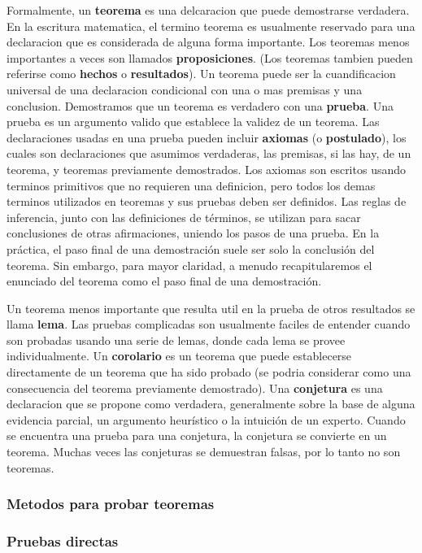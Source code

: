 \documentclass[]{article}
\begin{document}
Formalmente, un \textbf{teorema} es una delcaracion que puede demostrarse verdadera. En la escritura matematica, el termino teorema es usualmente reservado para una declaracion que es considerada de alguna forma importante. Los teoremas menos importantes a veces son llamados \textbf{proposiciones}. (Los teoremas tambien pueden referirse como \textbf{hechos} o \textbf{resultados}). Un teorema puede ser la cuandificacion universal de una declaracion condicional con una o mas premisas y una conclusion. Demostramos que un teorema es verdadero con una \textbf{prueba}. Una prueba es un argumento valido que establece la validez de un teorema. Las declaraciones usadas en una prueba pueden incluir \textbf{axiomas} (o \textbf{postulado}), los cuales son declaraciones que asumimos verdaderas, las premisas, si las hay, de un teorema, y teoremas previamente demostrados. Los axiomas son escritos usando terminos primitivos que no requieren una definicion, pero todos los demas terminos utilizados en teoremas y sus pruebas deben ser definidos. Las reglas de inferencia, junto con las definiciones de términos, se utilizan para sacar conclusiones de otras afirmaciones, uniendo los pasos de una prueba. En la práctica, el paso final de una demostración suele ser solo la conclusión del teorema. Sin embargo, para mayor claridad, a menudo recapitularemos el enunciado del teorema como el paso final de una demostración.

Un teorema menos importante que resulta util en la prueba de otros resultados se llama \textbf{lema}. Las pruebas complicadas son usualmente faciles de entender cuando son probadas usando una serie de lemas, donde cada lema se provee individualmente. Un \textbf{corolario} es un teorema que puede establecerse directamente de un teorema que ha sido probado (se podria considerar como una consecuencia del teorema previamente demostrado). Una \textbf{conjetura} es una declaracion que se propone como verdadera, generalmente sobre la base de alguna evidencia parcial, un argumento heurístico o la intuición de un experto. Cuando se encuentra una prueba para una conjetura, la conjetura se convierte en un teorema. Muchas veces las conjeturas se demuestran falsas, por lo tanto no son teoremas.

\subsubsection*{Metodos para probar teoremas}

\subsubsection*{Pruebas directas}
\end{document}
